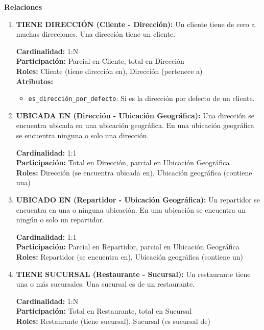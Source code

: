 \textbf{Relaciones}
\begin{enumerate}
    \item \textbf{TIENE DIRECCIÓN (Cliente - Dirección):} Un cliente tiene de cero a muchas direcciones. Una dirección tiene un cliente.

    \textbf{Cardinalidad:} 1:N \\
    \textbf{Participación:} Parcial en Cliente, total en Dirección \\
    \textbf{Roles:} Cliente (tiene dirección en), Dirección (pertenece a) \\
    \textbf{Atributos:}
    \begin{itemize}
        \item \texttt{es\_dirección\_por\_defecto}: Si es la dirección por defecto de un cliente.
    \end{itemize}

    \item \textbf{UBICADA EN (Dirección - Ubicación Geográfica):} Una dirección se encuentra ubicada en una ubicación geográfica. En una ubicación geográfica se encuentra ninguna o solo una dirección.

    \textbf{Cardinalidad:} 1:1 \\
    \textbf{Participación:} Total en Dirección, parcial en Ubicación Geográfica \\
    \textbf{Roles:} Dirección (se encuentra ubicada en), Ubicación geográfica (contiene una)

    \item \textbf{UBICADO EN (Repartidor - Ubicación Geográfica):} Un repartidor se encuentra en una o ninguna ubicación. En una ubicación se encuentra un ningún o solo un repartidor.

    \textbf{Cardinalidad:} 1:1 \\
    \textbf{Participación:} Parcial en Repartidor, parcial en Ubicación Geográfica \\
    \textbf{Roles:} Repartidor (se encuentra en), Ubicación geográfica (contiene un)

    \item \textbf{TIENE SUCURSAL (Restaurante - Sucursal):} Un restaurante tiene una o más sucursales. Una sucursal es de un restaurante.

    \textbf{Cardinalidad:} 1:N \\
    \textbf{Participación:} Total en Restaurante, total en Sucursal \\
    \textbf{Roles:} Restaurante (tiene sucursal), Sucursal (es sucursal de)


\end{enumerate}
